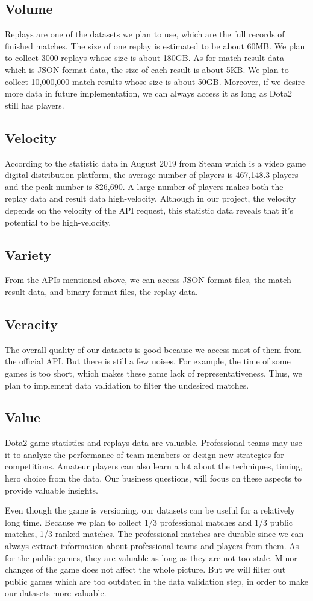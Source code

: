 \documentclass{article}
\newcommand{\bigdataVs}[1]{
	\subsection{#1}
}
\begin{document}
\bigdataVs{Volume}

Replays are one of the datasets we plan to use, which are the full records of finished matches. The size of one replay is estimated to be about 60MB. We plan to collect 3000 replays whose size is about 180GB. As for match result data which is JSON-format data, the size of each result is about 5KB. We plan to collect 10,000,000 match results whose size is about 50GB. Moreover, if we desire more data in future implementation, we can always access it as long as Dota2 still has players.

\bigdataVs{Velocity}

According to the statistic data in August 2019 from Steam which is a video game digital distribution platform, the average number of players is 467,148.3 players and the peak number is 826,690.
A large number of players makes both the replay data and result data high-velocity.
Although in our project, the velocity depends on the velocity of the API request, this statistic data reveals that it's potential to be high-velocity.

\bigdataVs{Variety}

From the APIs mentioned above, we can access JSON format files, the match result data, and binary format files, the replay data.

\bigdataVs{Veracity}

The overall quality of our datasets is good because we access most of them from the official API.
But there is still a few noises.
For example, the time of some games is too short, which makes these game lack of representativeness.
Thus, we plan to implement data validation to filter the undesired matches.

\bigdataVs{Value}

Dota2 game statistics and replays data are valuable.
Professional teams may use it to analyze the performance of team members or design new strategies for competitions.
Amateur players can also learn a lot about the techniques, timing, hero choice from the data.
Our business questions, will focus on these aspects to provide valuable insights.

Even though the game is versioning, our datasets can be useful for a relatively long time.
Because we plan to collect 1/3 \gls{professional matches} and 1/3 \gls{public matches}, 1/3 \gls{ranked matches}.
The professional matches are durable since we can always extract information about professional teams and players from them.
As for the public games, they are valuable as long as they are not too stale. Minor changes of the game does not affect the whole picture.
But we will filter out public games which are too outdated in the data validation step, in order to make our datasets more valuable.
\end{document}
